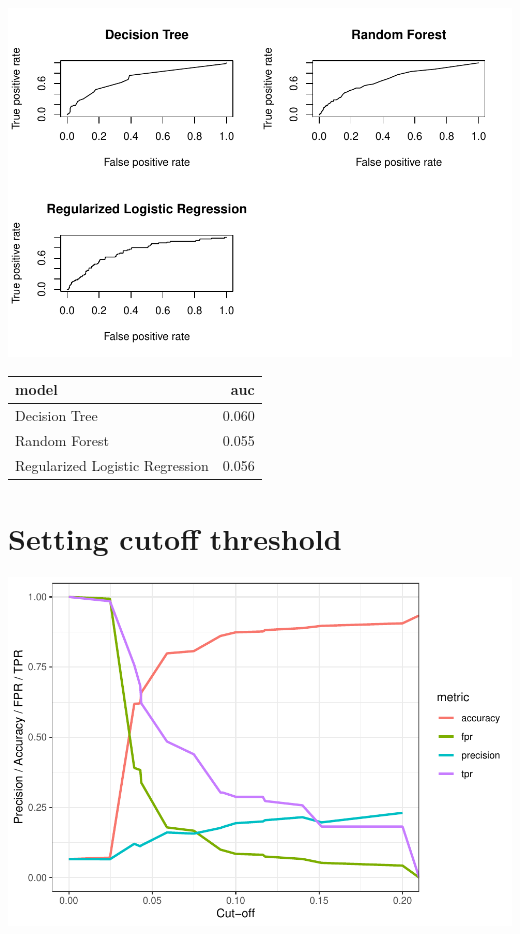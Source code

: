 \documentclass[
  12pt,
  oneside]{report}
\begin{document}
\includegraphics[width=1.5\linewidth]{leroy_francois_hw2_files/figure-latex/unnamed-chunk-17-1}

\begin{table}[H]
\centering
\begin{tabular}{l|r}
\hline
model & auc\\
\hline
Decision Tree & 0.060\\
\hline
Random Forest & 0.055\\
\hline
Regularized Logistic Regression & 0.056\\
\hline
\end{tabular}
\end{table}

\hypertarget{setting-cutoff-threshold}{%
\section{Setting cutoff threshold}\label{setting-cutoff-threshold}}

\includegraphics{leroy_francois_hw2_files/figure-latex/unnamed-chunk-19-1.pdf}
\end{document}
